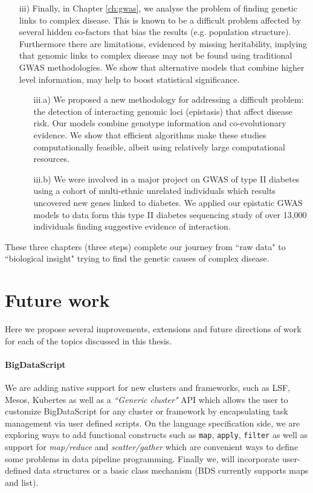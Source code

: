 \begin{itemize}
\item[iii)] Finally, in Chapter \ref{ch:gwas}, we analyse the problem of finding genetic links to complex disease. 
This is known to be a difficult problem affected by several hidden co-factors that bias the results (e.g. population structure). 
Furthermore there are limitations, evidenced by missing heritability, implying that genomic links to complex disease may not be found using traditional GWAS methodologies. 
We show that alternative models that combine higher level information, may help to boost statistical significance. 

	\begin{itemize}
		\item[iii.a)] We proposed a new methodology for addressing a difficult problem: the detection of interacting genomic loci (epistasis) that affect disease risk. 
		Our models combine genotype information and co-evolutionary evidence. We show that efficient algorithms make these studies computationally feasible, albeit using relatively large computational resources.
	
		\item[iii.b)] We were involved in a major project on GWAS of type II diabetes using a cohort of multi-ethnic unrelated individuals which results uncovered new genes linked to diabetes. 
		We applied our epistatic GWAS models to data form this type II diabetes sequencing study of over 13,000 individuals finding suggestive evidence of interaction.
			\end{itemize}
	
\end{itemize}

These three chapters (three steps) complete our journey from ``raw data" to ``biological insight" trying to find the genetic causes of complex disease.

\section{Future work}

Here we propose several improvements, extensions and future directions of work for each of the topics discussed in this thesis. \\

\paragraph{BigDataScript}
We are adding native support for new clusters and frameworks, such as LSF, Mesos, Kubertes as well as a \textit{``Generic cluster"} API which allows the user to customize BigDataScript for any cluster or framework by encapsulating task management via user defined scripts. 
On the language specification side, we are exploring ways to add functional constructs such as \texttt{map}, \texttt{apply}, \texttt{filter} as well as support for \textit{map/reduce} and \textit{scatter/gather} which are convenient ways to define some problems in data pipeline programming. 
Finally we, will incorporate user-defined data structures or a basic class mechanism (BDS currently supports maps and list).

